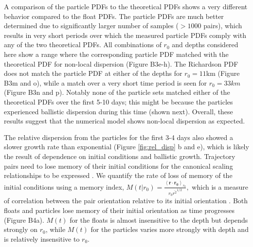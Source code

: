 \documentclass[]{ametsoc}
\begin{document}
A comparison of the particle PDFs to the theoretical PDFs shows a very different behavior compared to the float PDFs. The particle PDFs are much better determined due to significantly larger number of samples ($>1000$ pairs), which results in very short periods over which the measured particle PDFs comply with any of the two theoretical PDFs. All combinations of $r_0$ and depths considered here show a range where the corresponding particle PDF matched with the theoretical PDF for non-local dispersion (Figure B3e-h). The Richardson PDF does not match the particle PDF at either of the depths for $r_0=11$km (Figure B3m and o), while a match over a very short time period is seen for $r_0=33km$ (Figure B3n and p). Notably none of the particle sets matched either of the theoretical PDFs over the first 5-10 days; this might be because the particles experienced ballistic dispersion during this time (shown next). Overall, these results suggest that the numerical model shows non-local dispersion as expected.

The relative dispersion from the particles for the first 3-4 days also showed a slower growth rate than exponential (Figure \ref{fig:rel_disp} b and e), which is likely the result of dependence on initial conditions and ballistic growth. Trajectory pairs need to lose memory of their initial conditions for the canonical scaling relationships to be expressed \citep{babiano1990relative, nicolleau2004two, bourgoin2006role, foussard2017relative}. We quantify the rate of loss of memory of the initial conditions using a memory index, 
$M(t| r_0) = \frac{\left<\mathbf{r} \cdot \mathbf{r_0} \right>_{r_0}}{r_0 \overline{r^2}^{1/2}},
$
which is a measure of correlation between the pair orientation relative to its initial orientation \citep{foussard2017relative}. Both floats and particles lose memory of their initial orientation as time progresses (Figure B4a). $M(t)$ for the floats is almost insensitive to the depth but depends strongly on $r_0$, while $M(t)$ for the particles varies more strongly with depth and is relatively insensitive to $r_0$. 
\end{document}
